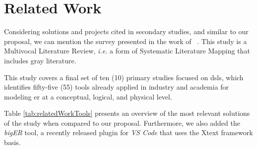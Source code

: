 \section{Related Work} \label{sec_slm:relatedWork}

Considering solutions and projects cited in secondary studies, and similar to our proposal, we can mention the survey presented in the work of ~\cite{eres:2021}.
This study is a Multivocal Literature Review, \textit{i.e.} a form of Systematic Literature Mapping that includes gray literature.

This study covers a final set of ten (10) primary studies focused on \acp{dsl}, which identifies fifty-five (55) tools already applied in industry and academia for modeling \ac{er} at a conceptual, logical, and physical level.

Table \ref{tab:relatedWorkTools}  presents an overview of the most relevant solutions of the study when compared to our proposal.
Furthermore, we also added the \textit{bigER} tool, a recently released plugin for \textit{VS Code} that uses the Xtext framework basis.

